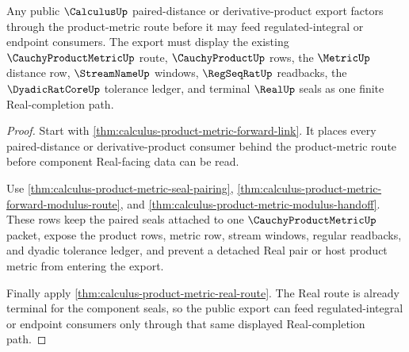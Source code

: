 \begin{theorem}
\label{thm:calculus-product-metric-forward-link-export}
Any public $\CalculusUp$ paired-distance or derivative-product export factors through the product-metric route before it may feed regulated-integral or endpoint consumers. The export must display the existing $\CauchyProductMetricUp$ route, $\CauchyProductUp$ rows, the $\MetricUp$ distance row, $\StreamNameUp$ windows, $\RegSeqRatUp$ readbacks, the $\DyadicRatCoreUp$ tolerance ledger, and terminal $\RealUp$ seals as one finite Real-completion path.
\end{theorem}
\begin{proof}
Start with \autoref{thm:calculus-product-metric-forward-link}. It places every paired-distance or derivative-product consumer behind the product-metric route before component Real-facing data can be read.

Use \autoref{thm:calculus-product-metric-seal-pairing}, \autoref{thm:calculus-product-metric-forward-modulus-route}, and \autoref{thm:calculus-product-metric-modulus-handoff}. These rows keep the paired seals attached to one $\CauchyProductMetricUp$ packet, expose the product rows, metric row, stream windows, regular readbacks, and dyadic tolerance ledger, and prevent a detached Real pair or host product metric from entering the export.

Finally apply \autoref{thm:calculus-product-metric-real-route}. The Real route is already terminal for the component seals, so the public export can feed regulated-integral or endpoint consumers only through that same displayed Real-completion path.
\end{proof}
